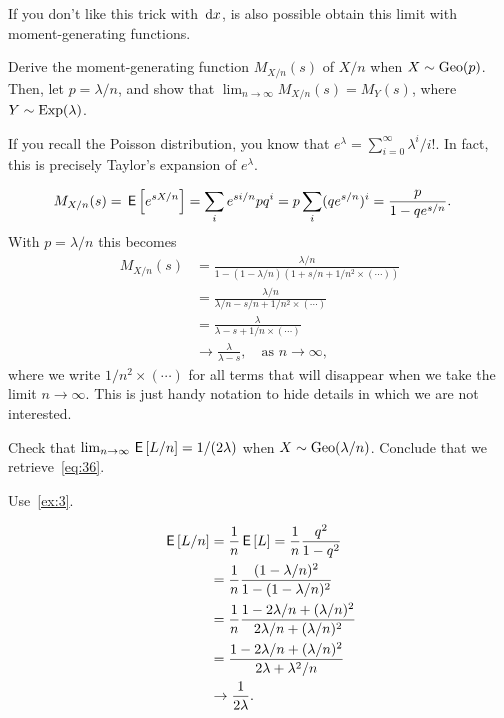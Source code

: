 \documentclass[a4paper,11pt]{article}
\begin{document}
If you don't like this trick with $\,\textrm{d}x$, is also possible obtain this limit with moment-generating functions.

\begin{exercise}
Derive the moment-generating function $M_{X/n}(s)$ of $X/n$ when $X\sim \mathrm{Geo}(p)$.
Then, let $p = \lambda/n$, and show that $\lim_{n\to\infty}M_{X/n}(s) = M_{Y}(s)$, where $Y \sim \mathrm{Exp}(\lambda)$.
\begin{hint}
  If you recall the Poisson distribution, you know that $e^{\lambda} = \sum_{i=0}^{\infty}\lambda^{i}/i!$.
  In fact, this is precisely Taylor's expansion of $e^{\lambda}$.
\end{hint}
\begin{solution}
  \begin{align}
    \label{eq:20}
M_{X/n}(s) 
&= \,\mathsf{E}\left[e^{s X/n}\right] = \sum_{i} e^{s i/n} p q^{i} = p\sum_{i} (qe^{s/n})^{i} = \frac{p}{1-qe^{s/n}}.
  \end{align}
With $p=\lambda/n$ this becomes
  \begin{align}
M_{X/n}(s) 
&= \frac{\lambda/n}{1-(1-\lambda/n) (1+s/n + 1/n^{2}\times(\cdots))} \\
&= \frac{\lambda/n}{\lambda/n - s/n + 1/n^{2}\times (\cdots)} \\
&= \frac{\lambda}{\lambda - s + 1/n\times(\cdots)} \\
&\to \frac{\lambda}{\lambda - s}, \quad\text{as }  n\to \infty,
  \end{align}
  where we write $1/n^{2}\times(\cdots)$ for all terms that will disappear when we take the limit $n\to \infty$.
  This is just handy notation to hide details in which we are not interested.
\end{solution}
\end{exercise}

\begin{exercise}\label{ex:11}
Check that $\lim_{n\to\infty}\,\mathsf{E}\left[L/n\right] = 1/(2\lambda)$ when $X\sim \mathrm{Geo}(\lambda/n)$. Conclude that  we retrieve~\cref{eq:36}.
\begin{hint}
  Use~\cref{ex:3}.
\end{hint}
\begin{solution}
  \begin{align}
    \label{eq:21}
\,\mathsf{E}\left[L/n\right]  &= \frac 1 n \,\mathsf{E}\left[L\right] = \frac 1 n \frac{q^2}{1-q^{2}} \\
 &= \frac 1 n \frac{(1-\lambda/n)^2}{1-(1-\lambda/n)^{2}} \\
 &= \frac 1 n \frac{1-2 \lambda/n + (\lambda/n)^2}{2 \lambda /n + (\lambda/n)^{2}} \\
 &= \frac{1-2 \lambda/n + (\lambda/n)^2}{2 \lambda + \lambda^{2}/n} \\
&\to \frac 1{2\lambda}.
  \end{align}
\end{solution}
\end{exercise}
\end{document}
